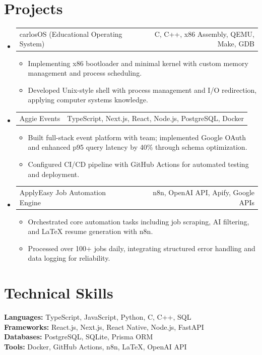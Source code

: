 \documentclass[letterpaper,11pt]{article}
\makeatletter
\newcommand{\resumeItem}[1]{
  \item\small{{#1 \vspace{-2pt}}}
}
\newcommand{\resumeProjectHeading}[2]{
    \item
    \begin{tabular*}{0.97\textwidth}{l@{\extracolsep{\fill}}r}
      \small#1 & #2 \\
    \end{tabular*}\vspace{-7pt}
}
\newcommand{\resumeSubHeadingListStart}{\begin{itemize}[leftmargin=0.15in, label={}]}
\newcommand{\resumeSubHeadingListEnd}{\end{itemize}}
\newcommand{\resumeItemListStart}{\begin{itemize}}
\newcommand{\resumeItemListEnd}{\end{itemize}\vspace{-5pt}}
\makeatother
\begin{document}
\section{Projects}
\resumeSubHeadingListStart

\resumeProjectHeading
{carlosOS (Educational Operating System)}{C, C++, x86 Assembly, QEMU, Make, GDB}
\resumeItemListStart
\resumeItem{Implementing x86 bootloader and minimal kernel with custom memory management and process scheduling.}
\resumeItem{Developed Unix-style shell with process management and I/O redirection, applying computer systems knowledge.}
\resumeItemListEnd

\resumeProjectHeading
{Aggie Events}{TypeScript, Next.js, React, Node.js, PostgreSQL, Docker}
\resumeItemListStart
\resumeItem{Built full-stack event platform with team; implemented Google OAuth and enhanced p95 query latency by 40\% through schema optimization.}
\resumeItem{Configured CI/CD pipeline with GitHub Actions for automated testing and deployment.}
\resumeItemListEnd

\resumeProjectHeading
{ApplyEasy Job Automation Engine}{n8n, OpenAI API, Apify, Google APIs}
\resumeItemListStart
\resumeItem{Orchestrated core automation tasks including job scraping, AI filtering, and LaTeX resume generation with n8n.}
\resumeItem{Processed over 100+ jobs daily, integrating structured error handling and data logging for reliability.}
\resumeItemListEnd

\resumeSubHeadingListEnd

\section{Technical Skills}
\begin{itemize}[leftmargin=0.15in, label={}]
  \small{\item{
    \textbf{Languages:} TypeScript, JavaScript, Python, C, C++, SQL \\
    \textbf{Frameworks:} React.js, Next.js, React Native, Node.js, FastAPI \\
    \textbf{Databases:} PostgreSQL, SQLite, Prisma ORM \\
    \textbf{Tools:} Docker, GitHub Actions, n8n, LaTeX, OpenAI API
  }}
\end{itemize}
\end{document}
